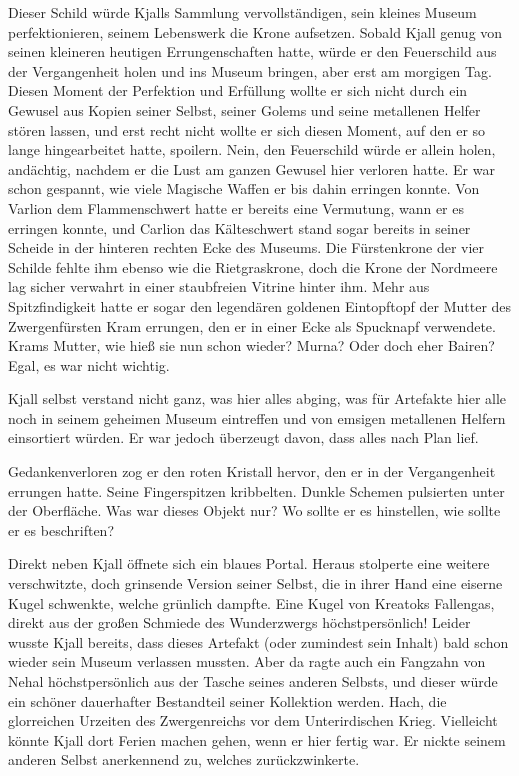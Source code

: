 \documentclass[10pt, a4paper, oneside]{book}
\begin{document}
Dieser Schild würde Kjalls Sammlung vervollständigen, sein kleines Museum perfektionieren, seinem Lebenswerk die Krone aufsetzen. Sobald Kjall genug von seinen kleineren heutigen Errungenschaften hatte, würde er den Feuerschild aus der Vergangenheit holen und ins Museum bringen, aber erst am morgigen Tag. Diesen Moment der Perfektion und Erfüllung wollte er sich nicht durch ein Gewusel aus Kopien seiner Selbst, seiner Golems und seine metallenen Helfer stören lassen, und erst recht nicht wollte er sich diesen Moment, auf den er so lange hingearbeitet hatte, spoilern. Nein, den Feuerschild würde er allein holen, andächtig, nachdem er die Lust am ganzen Gewusel hier verloren hatte. Er war schon gespannt, wie viele Magische Waffen er bis dahin erringen konnte. Von Varlion dem Flammenschwert hatte er bereits eine Vermutung, wann er es erringen konnte, und Carlion das Kälteschwert stand sogar bereits in seiner Scheide in der hinteren rechten Ecke des Museums. Die Fürstenkrone der vier Schilde fehlte ihm ebenso wie die Rietgraskrone, doch die Krone der Nordmeere lag sicher verwahrt in einer staubfreien Vitrine hinter ihm. Mehr aus Spitzfindigkeit hatte er sogar den legendären goldenen Eintopftopf der Mutter des Zwergenfürsten Kram errungen, den er in einer Ecke als Spucknapf verwendete. Krams Mutter, wie hieß sie nun schon wieder? Murna? Oder doch eher Bairen? Egal, es war nicht wichtig.

Kjall selbst verstand nicht ganz, was hier alles abging, was für Artefakte hier alle noch in seinem geheimen Museum eintreffen und von emsigen metallenen Helfern einsortiert würden. Er war jedoch überzeugt davon, dass alles nach Plan lief.

Gedankenverloren zog er den roten Kristall hervor, den er in der Vergangenheit errungen hatte. Seine Fingerspitzen kribbelten. Dunkle Schemen pulsierten unter der Oberfläche. Was war dieses Objekt nur? Wo sollte er es hinstellen, wie sollte er es beschriften?

Direkt neben Kjall öffnete sich ein blaues Portal. Heraus stolperte eine weitere verschwitzte, doch grinsende Version seiner Selbst, die in ihrer Hand eine eiserne Kugel schwenkte, welche grünlich dampfte. Eine Kugel von Kreatoks Fallengas, direkt aus der großen Schmiede des Wunderzwergs höchstpersönlich! Leider wusste Kjall bereits, dass dieses Artefakt (oder zumindest sein Inhalt) bald schon wieder sein Museum verlassen mussten. Aber da ragte auch ein Fangzahn von Nehal höchstpersönlich aus der Tasche seines anderen Selbsts, und dieser würde ein schöner dauerhafter Bestandteil seiner Kollektion werden. Hach, die glorreichen Urzeiten des Zwergenreichs vor dem Unterirdischen Krieg. Vielleicht könnte Kjall dort Ferien machen gehen, wenn er hier fertig war. Er nickte seinem anderen Selbst anerkennend zu, welches zurückzwinkerte.
\end{document}
